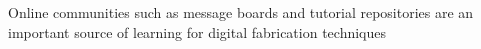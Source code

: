 Online communities such as message boards and tutorial repositories are an important source of learning for digital fabrication techniques